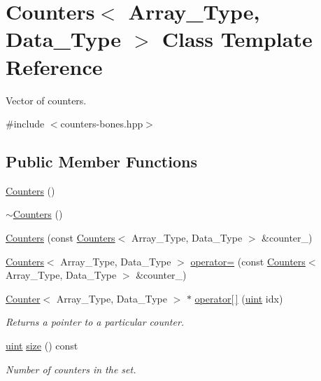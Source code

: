 \hypertarget{class_counters}{}\section{Counters$<$ Array\+\_\+\+Type, Data\+\_\+\+Type $>$ Class Template Reference}
\label{class_counters}


Vector of counters.  




{\ttfamily \#include $<$counters-\/bones.\+hpp$>$}

\subsection*{Public Member Functions}
\begin{DoxyCompactItemize}
\item 
\hyperlink{class_counters_a98e4efd06b3d878609911e392a8f42ce}{Counters} ()
\item 
\hyperlink{class_counters_a6ce3fa5d32d646efb5d83fa1feaf5e95}{$\sim$\+Counters} ()
\item 
\hyperlink{class_counters_a178c0267c1f52a36e10e9d257a21a224}{Counters} (const \hyperlink{class_counters}{Counters}$<$ Array\+\_\+\+Type, Data\+\_\+\+Type $>$ \&counter\+\_\+)
\item 
\hyperlink{class_counters}{Counters}$<$ Array\+\_\+\+Type, Data\+\_\+\+Type $>$ \hyperlink{class_counters_a0edeb22b0b1640f7ada1ef47a30ac486}{operator=} (const \hyperlink{class_counters}{Counters}$<$ Array\+\_\+\+Type, Data\+\_\+\+Type $>$ \&counter\+\_\+)
\item 
\hyperlink{class_counter}{Counter}$<$ Array\+\_\+\+Type, Data\+\_\+\+Type $>$ $\ast$ \hyperlink{class_counters_a9c3ff72b5e24a299e3c1aecad0ea5eb2}{operator\mbox{[}$\,$\mbox{]}} (\hyperlink{typedefs_8hpp_a91ad9478d81a7aaf2593e8d9c3d06a14}{uint} idx)
\begin{DoxyCompactList}\small\item\em Returns a pointer to a particular counter. \end{DoxyCompactList}\item 
\hyperlink{typedefs_8hpp_a91ad9478d81a7aaf2593e8d9c3d06a14}{uint} \hyperlink{class_counters_af213b17c55496b565ad6ce7a9b0a56e1}{size} () const
\begin{DoxyCompactList}\small\item\em Number of counters in the set. \end{DoxyCompactList}\item 

\end{DoxyCompactItemize}
